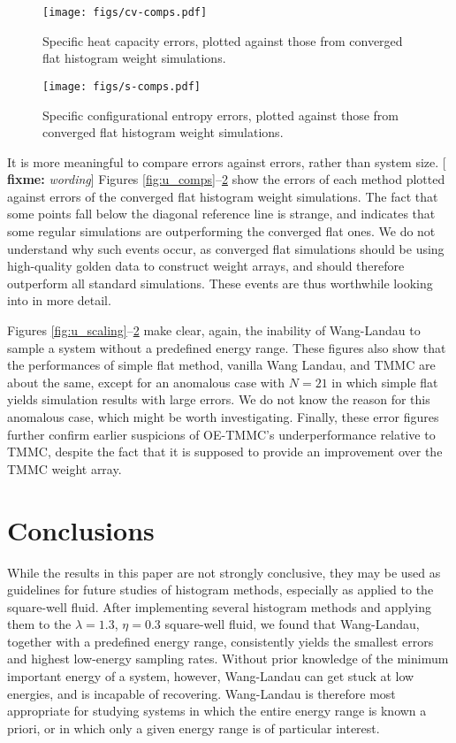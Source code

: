 \documentclass[11pt]{article}
\newcommand{\red}[1]{{\bf \color{red} #1}}
\newcommand{\fixme}[1]{[\red{fixme:} \emph{#1}]}
\begin{document}
\begin{figure}[p]
  \centering
  \texttt{[image: figs/cv-comps.pdf]}
  \caption[Heat capacity error comparisons]
  {Specific heat capacity errors, plotted against those from converged
    flat histogram weight simulations.}
  \label{fig:cv_comps}
\end{figure}

\begin{figure}
  \centering
  \texttt{[image: figs/s-comps.pdf]}
  \caption[Configurational entropy error comparisons]
  {Specific configurational entropy errors, plotted against those from
    converged flat histogram weight simulations.}
  \label{fig:s_comps}
\end{figure}


It is more meaningful to compare errors against errors, rather than
system size. \fixme{wording} Figures
\ref{fig:u_comps}--\ref{fig:s_comps} show the errors of each method
plotted against errors of the converged flat histogram weight
simulations. The fact that some points fall below the diagonal
reference line is strange, and indicates that some regular simulations
are outperforming the converged flat ones. We do not understand why
such events occur, as converged flat simulations should be using
high-quality golden data to construct weight arrays, and should
therefore outperform all standard simulations. These events are thus
worthwhile looking into in more detail.

Figures \ref{fig:u_scaling}--\ref{fig:s_comps} make clear, again, the
inability of Wang-Landau to sample a system without a predefined
energy range. These figures also show that the performances of simple
flat method, vanilla Wang Landau, and TMMC are about the same, except
for an anomalous case with $N=21$ in which simple flat yields
simulation results with large errors. We do not know the reason for
this anomalous case, which might be worth investigating. Finally,
these error figures further confirm earlier suspicions of OE-TMMC's
underperformance relative to TMMC, despite the fact that it is
supposed to provide an improvement over the TMMC weight array.


\section{Conclusions}
\label{sec:conclusions}

While the results in this paper are not strongly conclusive, they may
be used as guidelines for future studies of histogram methods,
especially as applied to the square-well fluid. After implementing
several histogram methods and applying them to the $\lambda=1.3$,
$\eta=0.3$ square-well fluid, we found that Wang-Landau, together with
a predefined energy range, consistently yields the smallest errors and
highest low-energy sampling rates. Without prior knowledge of the
minimum important energy of a system, however, Wang-Landau can get
stuck at low energies, and is incapable of recovering. Wang-Landau is
therefore most appropriate for studying systems in which the entire
energy range is known a priori, or in which only a given energy range
is of particular interest.
\end{document}
